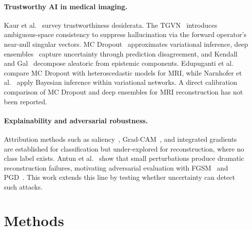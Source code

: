 \documentclass[runningheads]{llncs}
\begin{document}
\paragraph{Trustworthy AI in medical imaging.}
Kaur et al.~\cite{kaur2022trustworthy} survey trustworthiness desiderata. The TGVN~\cite{atalik2026tgvn} introduces ambiguous-space consistency to suppress hallucination via the forward operator's near-null singular vectors. MC Dropout~\cite{gal2016} approximates variational inference, deep ensembles~\cite{lakshminarayanan2017} capture uncertainty through prediction disagreement, and Kendall and Gal~\cite{kendall2017uncertainties} decompose aleatoric from epistemic components. Edupuganti et al.~\cite{edupuganti2021uncertainty} compare MC Dropout with heteroscedastic models for MRI, while Narnhofer et al.~\cite{narnhofer2022bayesian} apply Bayesian inference within variational networks. A direct calibration comparison of MC Dropout and deep ensembles for MRI reconstruction has not been reported.

\paragraph{Explainability and adversarial robustness.}
Attribution methods such as saliency~\cite{simonyan2014deep}, Grad-CAM~\cite{selvaraju2017}, and integrated gradients~\cite{sundararajan2017} are established for classification but under-explored for reconstruction, where no class label exists. Antun et al.~\cite{antun2020instabilities} show that small perturbations produce dramatic reconstruction failures, motivating adversarial evaluation with FGSM~\cite{goodfellow2015explaining} and PGD~\cite{madry2018towards}. This work extends this line by testing whether uncertainty can detect such attacks.

\section{Methods}\label{sec:methods}
\end{document}
